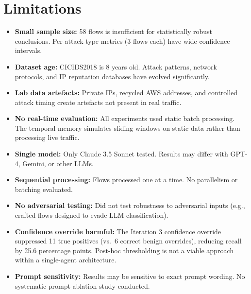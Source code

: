 \documentclass[12pt, a4paper, oneside]{report}
\begin{document}
\chapter{Limitations}
\label{ch:limitations-notes}

\begin{itemize}[leftmargin=2em]
  \item \textbf{Small sample size:} 58 flows is insufficient for statistically
        robust conclusions. Per-attack-type metrics (3 flows each) have wide
        confidence intervals.

  \item \textbf{Dataset age:} CICIDS2018 is 8 years old. Attack patterns,
        network protocols, and IP reputation databases have evolved significantly.

  \item \textbf{Lab data artefacts:} Private IPs, recycled AWS addresses, and
        controlled attack timing create artefacts not present in real traffic.

  \item \textbf{No real-time evaluation:} All experiments used static batch
        processing. The temporal memory simulates sliding windows on static data
        rather than processing live traffic.

  \item \textbf{Single model:} Only Claude 3.5 Sonnet tested. Results may differ
        with GPT-4, Gemini, or other LLMs.

  \item \textbf{Sequential processing:} Flows processed one at a time. No
        parallelism or batching evaluated.

  \item \textbf{No adversarial testing:} Did not test robustness to adversarial
        inputs (e.g., crafted flows designed to evade LLM classification).

  \item \textbf{Confidence override harmful:} The Iteration 3 confidence override
        suppressed 11 true positives (vs.\ 6 correct benign overrides), reducing
        recall by 25.6 percentage points. Post-hoc thresholding is not a viable
        approach within a single-agent architecture.

  \item \textbf{Prompt sensitivity:} Results may be sensitive to exact prompt
        wording. No systematic prompt ablation study conducted.
\end{itemize}
\end{document}

